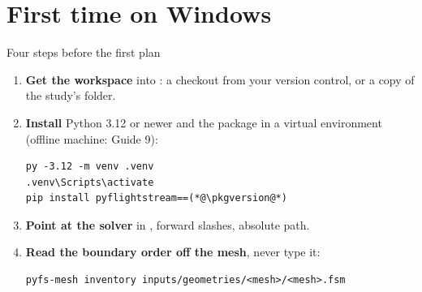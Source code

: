 %

\section{First time on Windows}

\begin{frame}[fragile]{Four steps before the first plan}
\begin{enumerate}
  \item \textbf{Get the workspace} into \code{\mainworkspace}: a checkout from
        your version control, or a copy of the study's folder.
  \item \textbf{Install} Python 3.12 or newer and the package in a virtual
        environment (offline machine: Guide 9):
\begin{lstlisting}[style=ftsbase]
py -3.12 -m venv .venv
.venv\Scripts\activate
pip install pyflightstream==(*@\pkgversion@*)
\end{lstlisting}
  \item \textbf{Point at the solver} in ,
        forward slashes, absolute path.
  \item \textbf{Read the boundary order off the mesh}, never type it:
\begin{lstlisting}[style=ftsbase]
pyfs-mesh inventory inputs/geometries/<mesh>/<mesh>.fsm
\end{lstlisting}
\end{enumerate}
\end{frame}

